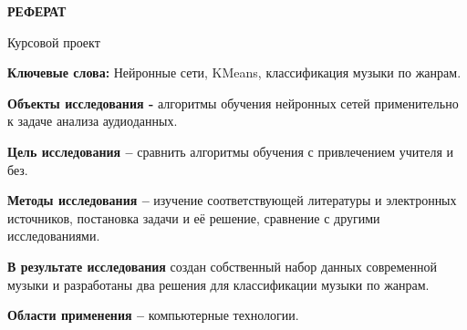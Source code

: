 \begin{center}
  \large\bfseries{РЕФЕРАТ}
\end{center}

Курсовой проект%

\textbf{Ключевые слова:} Нейронные сети, KMeans, классификация музыки по жанрам.

\textbf{Объекты исследования -} алгоритмы обучения нейронных сетей применительно к задаче анализа аудиоданных.

\textbf{Цель исследования --} сравнить алгоритмы обучения с привлечением учителя и без.

\textbf{Методы исследования --} изучение соответствующей литературы и электронных источников, постановка задачи и её решение, сравнение с другими исследованиями.

\textbf{В результате исследования} создан собственный набор данных современной музыки и разработаны два решения для классификации музыки по жанрам.

\textbf{Области применения --} компьютерные технологии.

\newpage